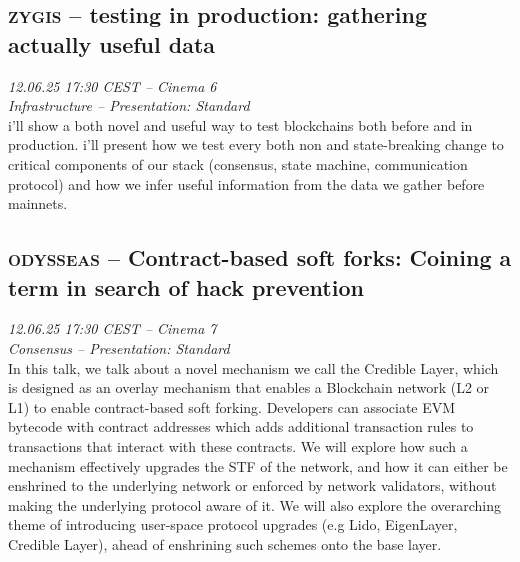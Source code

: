 \clearpage
\subsection {\textsc{zygis}  -- testing in production: gathering actually useful data} \noindent \textit {12.06.25 17:30 CEST -- Cinema 6\\ Infrastructure -- Presentation: Standard}\\[1em] i'll show a both novel and useful way to test blockchains both before and in production. i'll present how we test every both non and state-breaking change to critical components of our stack (consensus, state machine, communication protocol) and how we infer useful information from the data we gather before mainnets.

\clearpage
\subsection {\textsc{odysseas}  -- Contract-based soft forks: Coining a term in search of hack prevention} \noindent \textit {12.06.25 17:30 CEST -- Cinema 7\\ Consensus -- Presentation: Standard}\\[1em] In this talk, we talk about a novel mechanism we call the Credible Layer, which is designed as an overlay mechanism that enables a Blockchain network (L2 or L1) to enable contract-based soft forking. Developers can associate EVM bytecode with contract addresses which adds additional transaction rules  to transactions that interact with these contracts. We will explore how such a mechanism effectively upgrades the STF of the network, and how it can either be enshrined to the underlying network or enforced by network validators, without making the underlying protocol aware of it. We will also explore the overarching theme of introducing user-space protocol upgrades (e.g Lido, EigenLayer, Credible Layer), ahead of enshrining such schemes onto the base layer.

\clearpage

